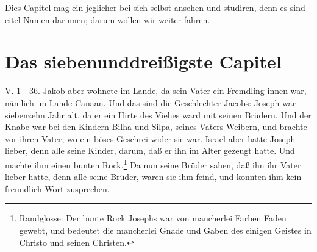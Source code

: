 Dies Capitel mag ein jeglicher bei sich selbst ansehen und studiren, denn es sind eitel Namen darinnen; darum wollen wir weiter fahren.

\section{Das siebenunddreißigste Capitel}
\begin{schriftzitat}
V. 1—36. Jakob aber wohnete im Lande, da sein Vater ein Fremdling innen war, nämlich im Lande Canaan. Und das sind die Geschlechter Jacobs: Joseph war siebenzehn Jahr alt, da er ein Hirte des Viehes ward mit seinen Brüdern. Und der Knabe war bei den Kindern Bilha und Silpa, seines Vaters Weibern, und brachte vor ihren Vater, wo ein böses Geschrei wider sie war. Israel aber hatte Joseph lieber, denn alle seine Kinder, darum, daß er ihn im Alter gezeugt hatte. Und machte ihm einen bunten Rock.\footnote{Randglosse: Der bunte Rock Josephs war von mancherlei Farben Faden gewebt, und bedeutet die mancherlei Gnade und Gaben des einigen Geistes in Christo und seinen Christen.} Da nun seine Brüder sahen, daß ihn ihr Vater lieber hatte, denn alle seine Brüder, waren sie ihm feind, und konnten ihm kein freundlich Wort zusprechen.

\end{schriftzitat}
